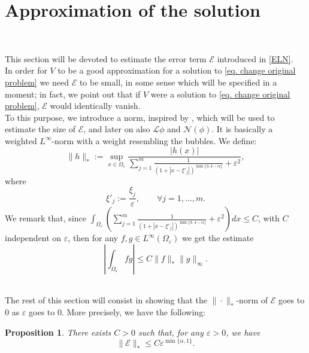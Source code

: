\documentclass[11pt]{article}
\newtheorem{proposition}{Proposition}[section]
\begin{document}
\section{Approximation of the solution}\

This section will be devoted to estimate the error term $\mathcal E$ introduced in \eqref{ELN}.\\

In order for $V$ to be a good approximation for a solution to \eqref{eq. change original problem} we need $\mathcal E$ to be small, in some sense which will be specified in a moment; in fact, we point out that if $V$ were a solution to \eqref{eq. change original problem}, $\mathcal E$ would identically vanish.\\
To this purpose, we introduce a norm, inspired by \cite{dkm}, which will be used to estimate the size of $\mathcal E$, and later on also $\mathcal L\phi$ and $\mathcal N(\phi)$. It is basically a weighted $L^\infty$-norm with a weight resembling the bubbles. We define:
\begin{equation}\label{norm}
\|h\|_\ast:=\sup_{x\in\Omega_\varepsilon}\frac{|h(x)|}{\sum_{j=1}^m\frac1{\left(1+\left|x-\xi'_j\right|\right)^{\min\{3,4-\alpha\}}}+\varepsilon^2},
\end{equation}
where
$$\xi'_j:=\frac{\xi_j}\varepsilon,\qquad\forall j=1,\dots,m.$$
We remark that, since $\int_{\Omega_\varepsilon}\left(\sum_{j=1}^m\frac1{\left(1+\left|x-\xi'_j\right|\right)^{\min\{3,4-\alpha\}}}+\varepsilon^2\right)dx\le C$, with $C$ independent on $\varepsilon$, then for any $f,g\in L^\infty(\Omega_\varepsilon)$ we get the estimate
$$\left|\int_{\Omega_\varepsilon}fg\right|\le C\|f\|_\ast\|g\|_\infty.$$\

The rest of this section will consist in showing that the $\|\cdot\|_\ast$-norm of $\mathcal E$ goes to $0$ as $\varepsilon$ goes to $0$. More precisely, we have the following:

\begin{proposition}\label{le. estimate of E}
There exists $C>0$ such that, for any $\varepsilon>0$, we have
$$\|\mathcal E\|_\ast\le C\varepsilon^{\min\{\alpha,1\}}.$$
\end{proposition}
\end{document}
